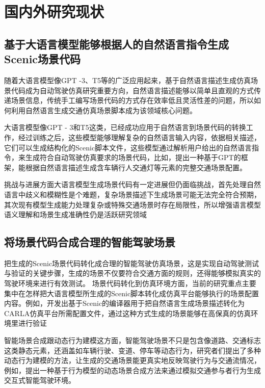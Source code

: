 \section{国内外研究现状}
\subsection{基于大语言模型能够根据人的自然语言指令生成Scenic场景代码}
随着大语言模型像GPT -3、T5等的广泛应用起来，基于自然语言描述生成仿真场景代码成为自动驾驶仿真研究重要方向，自然语言描述能够以简单且直观的方式传递场景信息\cite{klischat2020scenario}，传统手工编写场景代码的方式存在效率低且灵活性差的问题，所以如何利用自然语言生成交通仿真场景脚本成为该领域核心问题。

大语言模型像GPT - 3和T5这类\cite{Xu2023DriveGPT4}，已经成功应用于自然语言到场景代码的转换工作，经过训练之后，这些模型能够理解复杂的自然语言输入内容，依据相关描述，它们可以生成结构化的Scenic脚本文件\cite{scenario_runner_contributors2019carla}，这些模型通过解析用户给出的自然语言指令，来生成符合自动驾驶仿真要求的场景代码，比如，提出一种基于GPT的框架，能根据自然语言描述生成含车辆行人交通灯等元素的完整交通场景配置。

挑战与进展方面大语言模型生成场景代码有一定进展但仍面临挑战，首先处理自然语言中歧义和模糊性是个难题，复杂场景描述下生成场景可能无法完全符合预期，其次现有模型生成能力处理复杂或特殊交通场景时存在局限性，所以增强语言模型语义理解和场景生成准确性仍是活跃研究领域

\subsection{将场景代码合成合理的智能驾驶场景}
把生成的Scenic场景代码转化成合理的智能驾驶仿真场景\cite{wu2025complexscenes}，这是实现自动驾驶测试与验证的关键步骤，生成的场景不仅要符合交通方面的规则，还得能够模拟真实的驾驶环境来进行有效测试。
场景代码转化到仿真环境方面\cite{gu2025reinforcementlearning}，当前的研究重点主要集中在怎样把大语言模型所生成的Scenic脚本转化成仿真平台能够执行的场景配置内容。例如，开发出基于Scenic的编译器用于把自然语言生成场景描述转化为CARLA仿真平台所需配置文件，通过这种方式生成的场景能够在高保真的仿真环境里进行验证

智能场景合成跟动态行为建模这方面，智能驾驶场景不只是包含像道路、交通标志这类静态元素，还涵盖如车辆行驶、变道、停车等动态行为，研究者们提出了多种动态行为建模的方法，让生成的交通场景能更真实地反映驾驶行为与交通流情况\cite{wu2025taxi}，例如，提出一种基于行为模型的动态场景合成方法来通过模拟交通参与者行为生成交互式智能驾驶环境。

